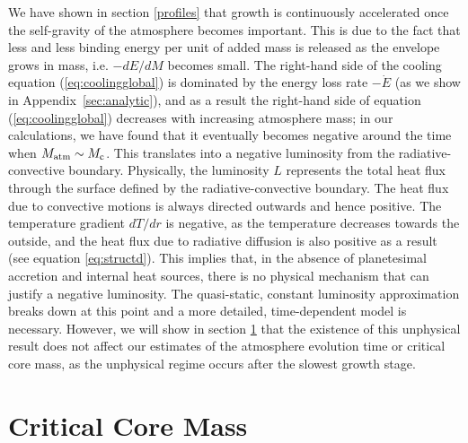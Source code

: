 \documentclass[apj]{emulateapj}
\newcommand{\App}[1]{Appendix~\ref{#1}}
\begin{document}
We have shown in section \ref{profiles} that growth is continuously accelerated once the self-gravity of the atmosphere becomes important. This is due to the fact that less and less binding energy per unit of added mass is released as the envelope grows in mass, i.e. $-dE/dM$ becomes small. The right-hand side of the cooling equation (\ref{eq:coolingglobal}) is dominated by the energy loss rate $-\dot{E}$ (as we show in \App{sec:analytic}), and as a result the right-hand side of equation (\ref{eq:coolingglobal}) decreases with increasing atmosphere mass; in our calculations, we have found that it eventually becomes negative around the time when $M_{\rm{atm}} \sim M_{\rm{c}}$. This translates into a negative luminosity from the radiative-convective boundary. Physically, the luminosity $L$ represents the total heat flux through the surface defined by the radiative-convective boundary. The heat flux due to convective motions is always directed outwards and hence positive. The temperature gradient $dT/dr$ is negative, as the temperature decreases towards the outside, and the heat flux due to radiative diffusion is also positive as a result (see equation \ref{eq:structd}). This implies that, in the absence of planetesimal accretion and internal heat sources, there is no physical mechanism that can justify a negative luminosity. The quasi-static, constant luminosity approximation breaks down at this point and a more detailed, time-dependent model is necessary. However, we will show in section \ref{critical} that the existence of this unphysical result does not affect our estimates of the atmosphere evolution time or critical core mass, as the unphysical regime occurs after the slowest growth stage. %




\section{Critical Core Mass}
\label{critical}
\end{document}
